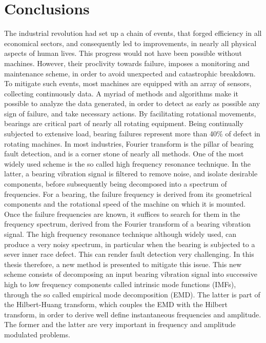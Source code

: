 \documentclass[../Main/thesis.tex]{subfiles}
\begin{document}
	\section{Conclusions}
	\label{sec:summary_and_conclusions}
	The industrial revolution had set up a chain of events, that forged efficiency in all economical sectors, and consequently led to improvements, in nearly all physical aspects of human lives. This progress would not have been possible without machines. However, their proclivity towards failure, imposes a monitoring and maintenance scheme, in order to avoid unexpected and catastrophic breakdown. To mitigate such events, most machines are equipped with an array of sensors, collecting continuously data. A myriad of methods and algorithms make it possible to analyze the data generated, in order to detect as early as possible any sign of failure, and take necessary actions.
	\justify
	By facilitating rotational movements, bearings are critical part of nearly all rotating equipment. Being continually subjected to extensive load, bearing failures represent more than 40$\%$ of defect in rotating machines. In most industries, Fourier transform is the pillar of bearing fault detection, and is a corner stone of nearly all methods.
	One of the most widely used scheme is the so called high frequency resonance technique. 
	In the latter, a bearing vibration signal is filtered to remove noise, and isolate desirable components, before subsequently being decomposed into a spectrum of frequencies. For a bearing, the failure frequency is derived from its geometrical components and the rotational speed of the machine on which it is mounted. Once the failure frequencies are known, it suffices to search for them in the frequency spectrum, derived from the Fourier transform of a bearing vibration signal. 
	\justify
	The high frequency resonance technique although widely used, can produce a very noisy spectrum, in particular when the bearing is subjected to a sever inner race defect. This can render fault detection very challenging. In this thesis therefore, a new method is presented to mitigate this issue.
	This new scheme consists of decomposing an input bearing vibration signal into successive high to low frequency components called intrinsic mode functions (IMFs), through the so called empirical mode decomposition (EMD). The latter is part of the Hilbert-Huang transform, which couples the EMD with the Hilbert transform, in order to derive well define instantaneous frequencies and amplitude. The former and the latter are very important in frequency and amplitude modulated problems.
\end{document}
